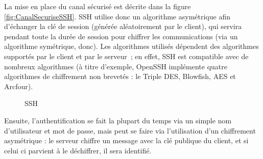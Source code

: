 La mise en place du canal sécurisé est décrite dans la figure
\ref{fig:CanalSecuriseSSH}. SSH utilise donc un algorithme asymétrique
afin d'échanger la clé de session (générée aléatoirement par le
client), qui servira pendant toute la
durée de session pour chiffrer les communications (via un
algorithme symétrique, donc). Les algorithmes utilisés dépendent
des algorithmes supportés par le client et par le serveur~; en
effet, SSH est compatible avec de nombreux algorithmes (à titre
d'exemple, OpenSSH implémente quatre algorithmes de chiffrement non
brevetés : le Triple DES, Blowfish, AES et Arcfour).

 
\begin{figure}[h]
\vspace{-10pt}
  \centering
    \hspace{1.2cm}
    \caption{SSH}
\end{figure}

Ensuite, l'authentification se fait la plupart du temps via un
simple nom d'utilisateur et mot de passe, mais peut se faire via
l'utilisation d'un chiffrement asymétrique : le serveur chiffre un message 
avec la clé
publique du client, et si celui ci parvient à le déchiffrer, il
sera identifié.
